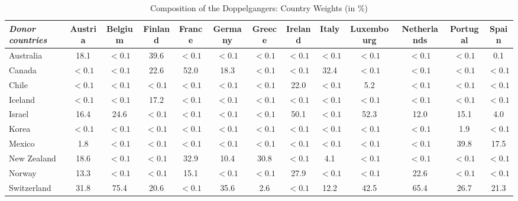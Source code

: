 \documentclass[12pt]{article}
\begin{document}
\begin{appendices}
\begin{landscape}
\begin{table}[htbp]
\scriptsize
\caption{\label{TA_weights_placebo}  Composition of the Doppelgangers: Country Weights (in \%)}\centering\medskip
\begin{tabular}{lcccccccccccc} \toprule
\textit{Donor countries} & Austria  & Belgium  & Finland  & France  & Germany  & Greece  & Ireland  & Italy  & Luxembourg  & Netherlands  & Portugal  & Spain  \\  \midrule
Australia &      18.1 &       $<0.1$ &      39.6 &       $<0.1$ &       $<0.1$ &       $<0.1$ &       $<0.1$ &       $<0.1$ &       $<0.1$ &       $<0.1$ &       $<0.1$ &       0.1 \\  
Canada &       $<0.1$ &       $<0.1$ &      22.6 &      52.0 &      18.3 &       $<0.1$ &       $<0.1$ &      32.4 &       $<0.1$ &       $<0.1$ &       $<0.1$ &       $<0.1$ \\  
Chile &       $<0.1$ &       $<0.1$ &       $<0.1$ &       $<0.1$ &       $<0.1$ &       $<0.1$ &      22.0 &       $<0.1$ &       5.2 &       $<0.1$ &       $<0.1$ &       $<0.1$ \\  
Iceland &       $<0.1$ &       $<0.1$ &      17.2 &       $<0.1$ &       $<0.1$ &       $<0.1$ &       $<0.1$ &       $<0.1$ &       $<0.1$ &       $<0.1$ &       $<0.1$ &       $<0.1$ \\  
Israel &      16.4 &      24.6 &       $<0.1$ &       $<0.1$ &       $<0.1$ &       $<0.1$ &      50.1 &       $<0.1$ &      52.3 &      12.0 &      15.1 &       4.0 \\  
Korea &       $<0.1$ &       $<0.1$ &       $<0.1$ &       $<0.1$ &       $<0.1$ &       $<0.1$ &       $<0.1$ &       $<0.1$ &       $<0.1$ &       $<0.1$ &       1.9 &       $<0.1$ \\  
Mexico &       1.8 &       $<0.1$ &       $<0.1$ &       $<0.1$ &       $<0.1$ &       $<0.1$ &       $<0.1$ &       $<0.1$ &       $<0.1$ &       $<0.1$ &      39.8 &      17.5 \\  
New Zealand &      18.6 &       $<0.1$ &       $<0.1$ &      32.9 &      10.4 &      30.8 &       $<0.1$ &       4.1 &       $<0.1$ &       $<0.1$ &       $<0.1$ &       $<0.1$ \\  
Norway &      13.3 &       $<0.1$ &       $<0.1$ &      15.1 &       $<0.1$ &       $<0.1$ &      27.9 &       $<0.1$ &       $<0.1$ &      22.6 &       $<0.1$ &       $<0.1$ \\  
Switzerland &      31.8 &      75.4 &      20.6 &       $<0.1$ &      35.6 &       2.6 &       $<0.1$ &      12.2 &      42.5 &      65.4 &      26.7 &      21.3 \\  

\end{tabular}
\end{table}
\end{landscape}
\end{appendices}
\end{document}
